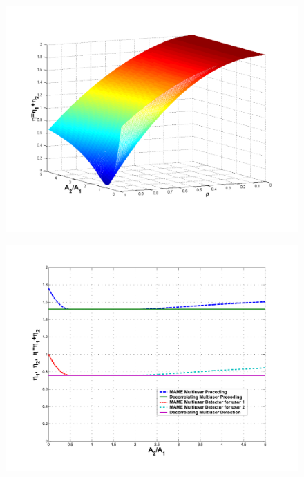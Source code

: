 \documentclass[20pt,landscape]{foils}
\begin{document}
\begin{figure}
\begin{center}
\includegraphics[width=8.0in]{AME_3D.pdf}
\end{center}
\end{figure}


\begin{figure}
\begin{center}
\includegraphics[width=8.0in]{AME_2D.pdf}
\end{center}
\end{figure}
\end{document}
